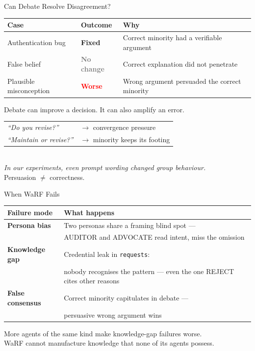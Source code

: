 \documentclass[10pt]{beamer}
\begin{document}
\begin{frame}{Can Debate Resolve Disagreement?}
  \small
  \begin{tabular}{p{2.8cm}p{1.8cm}p{4.2cm}}
    \toprule
    Case & Outcome & Why \\
    \midrule
    Authentication bug
      & \textcolor{green!60!black}{\textbf{Fixed}}
      & Correct minority had a verifiable argument \\[0.5em]
    False belief
      & \textcolor{gray}{\textbf{No change}}
      & Correct explanation did not penetrate \\[0.5em]
    Plausible misconception
      & \textcolor{red}{\textbf{Worse}}
      & Wrong argument persuaded the correct minority \\
    \bottomrule
  \end{tabular}

  \vfill
  \small
  Debate can improve a decision. It can also amplify an error.\\[0.5em]
  \begin{tabular}{ll}
    \textit{``Do you revise?''}      & $\to$ convergence pressure \\[0.2em]
    \textit{``Maintain or revise?''} & $\to$ minority keeps its footing \\
  \end{tabular}\\[0.3em]
  \small\textit{In our experiments, even prompt wording changed group behaviour.}\\[0.4em]
  \alert{Persuasion $\neq$ correctness.}
\end{frame}

\begin{frame}{When WaRF Fails}
  \small
  \begin{tabular}{p{2.8cm}p{6.4cm}}
    \toprule
    Failure mode & What happens \\
    \midrule
    \textbf{Persona bias}
      & Two personas share a framing blind spot ---\\
      & AUDITOR and ADVOCATE read intent, miss the omission \\[0.4em]
    \textbf{Knowledge gap}
      & Credential leak in \texttt{requests}:\\
      & nobody recognises the pattern --- even the one REJECT cites other reasons \\[0.4em]
    \textbf{False consensus}
      & Correct minority capitulates in debate ---\\
      & persuasive wrong argument wins \\
    \bottomrule
  \end{tabular}

  \vfill
  \small
  \alert{More agents of the same kind make knowledge-gap failures worse.}\\
  WaRF cannot manufacture knowledge that none of its agents possess.
\end{frame}
\end{document}
